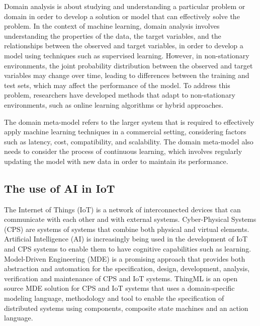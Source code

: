 Domain analysis \cite{mdApproachMonitoring}  is about studying and understanding a particular problem or domain in order to develop a solution or model that can effectively solve the problem. In the context of machine learning, domain analysis involves understanding the properties of the data, the target variables, and the relationships between the observed and target variables, in order to develop a model using techniques such as supervised learning. However, in non-stationary environments, the joint probability distribution between the observed and target variables may change over time, leading to differences between the training and test sets, which may affect the performance of the model. To address this problem, researchers have developed methods that adapt to non-stationary environments, such as online learning algorithms or hybrid approaches.

The domain meta-model refers to the larger system that is required to effectively apply machine learning techniques in a commercial setting, considering factors such as latency, cost, compatibility, and scalability. The domain meta-model also needs to consider the process of continuous learning, which involves regularly updating the model with new data in order to maintain its performance. \\

\subsection{The use of AI in IoT}
The Internet of Things (IoT) is a network of interconnected devices that can communicate with each other and with external systems. Cyber-Physical Systems (CPS) are systems of systems that combine both physical and virtual elements. Artificial Intelligence (AI) is increasingly being used in the development of IoT and CPS systems to enable them to have cognitive capabilities such as learning. Model-Driven Engineering (MDE) is a promising approach that provides both abstraction and automation for the specification, design, development, analysis, verification and maintenance of CPS and IoT systems. ThingML \cite{ThingML} is an open source MDE solution for CPS and IoT systems that uses a domain-specific modeling language, methodology and tool to enable the specification of distributed systems using components, composite state machines and an action language. 

